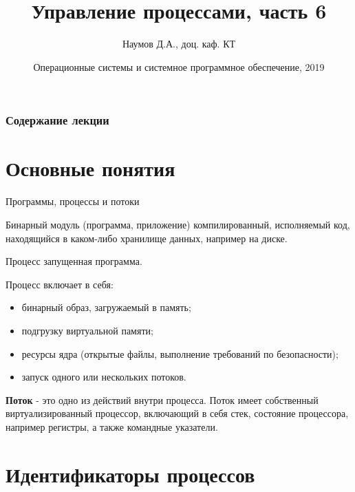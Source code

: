 \documentclass{beamer}
\title[Язык C]{Управление процессами, часть 6}
\author{Наумов Д.А., доц. каф. КТ}
\date[15.10.2019] {Операционные системы и системное программное обеспечение, 2019}
\begin{document}
\begin{frame}
  \titlepage
\end{frame}
  
\begin{frame}
  \frametitle{Содержание лекции}
  \tableofcontents  
\end{frame}

\section{Основные понятия}

\begin{frame}{Программы, процессы и потоки}
\begin{block}{Бинарный модуль (программа, приложение)}
компилированный, исполняемый код, находящийся в каком-либо хранилище данных, например на диске.
\end{block}
\begin{block}{Процесс}
запущенная программа.
\end{block}
Процесс включает в себя:
\begin{itemize}
\item бинарный образ, загружаемый в память;
\item подгрузку виртуальной памяти;
\item ресурсы ядра (открытые файлы, выполнение требований по безопасности);
\item запуск одного или нескольких потоков.
\end{itemize}
\textbf{Поток} - это одно из действий внутри процесса. Поток
имеет собственный виртуализированный процессор, включающий в себя стек,
состояние процессора, например регистры, а также командные указатели.
\end{frame}

\section{Идентификаторы процессов}
\end{document}
